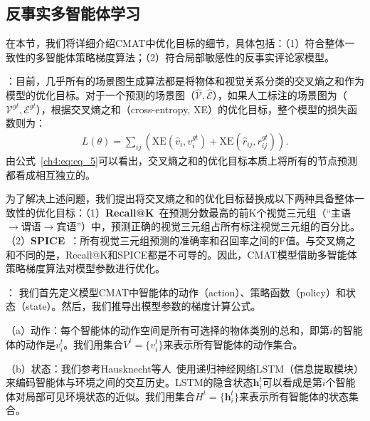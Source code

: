 \subsection{反事实多智能体学习}

在本节，我们将详细介绍CMAT中优化目标的细节，具体包括：（1）符合整体一致性的多智能体策略梯度算法；（2）符合局部敏感性的反事实评论家模型。


\textbf{}：目前，几乎所有的场景图生成算法都是将物体和视觉关系分类的交叉熵之和作为模型的优化目标。对于一个预测的场景图（$\hat{\mathcal{V}}, \hat{\mathcal{E}}$），如果人工标注的场景图为（$\mathcal{V}^{gt}, \mathcal{E}^{gt}$），根据交叉熵之和（cross-entropy, XE）的优化目标，整个模型的损失函数则为：
\begin{equation} \label{ch4:eq:eq_5}
\begin{aligned}
   L(\theta) =  \textstyle{\sum_{ij}} \left(\text{XE}(\hat{v}_i, v^{gt}_i) + \text{XE}(\hat{r}_{ij}, r^{gt}_{ij}) \right). 
\end{aligned}
\end{equation}
由公式~\eqref{ch4:eq:eq_5}可以看出，交叉熵之和的优化目标本质上将所有的节点预测都看成相互独立的。

为了解决上述问题，我们提出将交叉熵之和的优化目标替换成以下两种具备整体一致性的优化目标：（1）\textbf{Recall@K}~\cite{lu2016visual}在预测分数最高的前K个视觉三元组（“主语$\to$谓语$\to$宾语”）中，预测正确的视觉三元组占所有标注视觉三元组的百分比。（2）\textbf{SPICE}~\cite{anderson2016spice}：所有视觉三元组预测的准确率和召回率之间的F值。与交叉熵之和不同的是，Recall@K和SPICE都是不可导的。因此，CMAT模型借助多智能体策略梯度算法对模型参数进行优化。


\textbf{}：
我们首先定义模型CMAT中智能体的动作（action）、策略函数（policy）和状态（state）。然后，我们推导出模型参数的梯度计算公式。

（a）动作：每个智能体的动作空间是所有可选择的物体类别的总和，即第$i$的智能体的动作是$v^t_i$。我们用集合$V^t = \{v^t_i\}$来表示所有智能体的动作集合。

（b）状态：我们参考Hausknecht等人~\cite{hausknecht2015deep}使用递归神经网络LSTM（信息提取模块）来编码智能体与环境之间的交互历史。LSTM的隐含状态$\bm{h}^t_i$可以看成是第$i$个智能体对局部可见环境状态的近似。我们用集合$H^t = \{\bm{h}^t_i\}$来表示所有智能体的状态集合。

